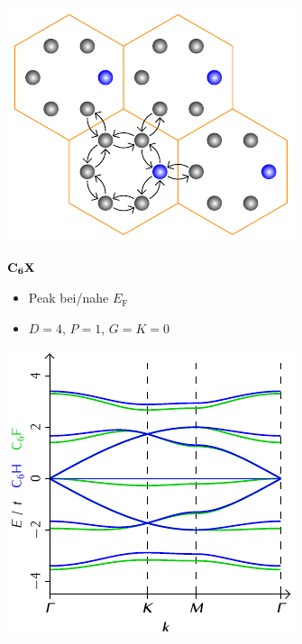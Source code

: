 \documentclass{beamer}
\newcommand \inlinetitle[1]{\begin{center} \color{MidnightBlue} \bf \Large #1 \end{center}}
\begin{document}
	\begin{frame}
		\begin{minipage}[b][0.48\textwidth][c]{0.48\textwidth}
			\includegraphics[width=\textwidth]{Abbildungen/Raumstrukturen/Sechstel.pdf}
		\end{minipage}
		\hfill
		\begin{minipage}[b][0.48\textwidth][c]{0.48\textwidth}
			\inlinetitle{$\bf C_{\boldsymbol 6}X$}
			\begin{itemize}
				\item Peak bei/nahe $E_\text{F}$
				\item $D = 4$, $P = 1$, $G = K = 0$
			\end{itemize}
		\end{minipage}
		\begin{minipage}{0.48\textwidth}
			\includegraphics[width=\textwidth]{Abbildungen/Bandstrukturen/C6X.pdf}

\end{minipage}
\end{frame}
\end{document}
